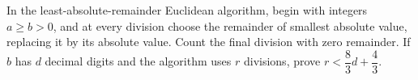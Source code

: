 In the least-absolute-remainder Euclidean algorithm, begin with integers $a\ge b>0$, and at every division choose the remainder of smallest absolute value, replacing it by its absolute value. Count the final division with zero remainder. If $b$ has $d$ decimal digits and the algorithm uses $r$ divisions, prove $r<\dfrac{8}{3}d+\dfrac{4}{3}$.
